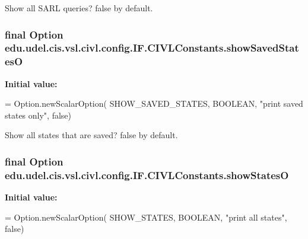 Show all S\+A\+R\+L queries? false by default. 

\hypertarget{classedu_1_1udel_1_1cis_1_1vsl_1_1civl_1_1config_1_1IF_1_1CIVLConstants_aa0f2c2af31ae647bc2dc6398a47031cb}{}
\subsubsection[{show\+Saved\+States\+O}]{\setlength{\rightskip}{0pt plus 5cm}final Option edu.\+udel.\+cis.\+vsl.\+civl.\+config.\+I\+F.\+C\+I\+V\+L\+Constants.\+show\+Saved\+States\+O\hspace{0.3cm}{\ttfamily [static]}}\label{classedu_1_1udel_1_1cis_1_1vsl_1_1civl_1_1config_1_1IF_1_1CIVLConstants_aa0f2c2af31ae647bc2dc6398a47031cb}
{\bfseries Initial value\+:}
\begin{DoxyCode}
= Option.newScalarOption(
            SHOW\_SAVED\_STATES, BOOLEAN, \textcolor{stringliteral}{"print saved states only"}, \textcolor{keyword}{false})
\end{DoxyCode}


Show all states that are saved? false by default. 

\hypertarget{classedu_1_1udel_1_1cis_1_1vsl_1_1civl_1_1config_1_1IF_1_1CIVLConstants_a4de1a46f393deba38173ced23addf465}{}
\subsubsection[{show\+States\+O}]{\setlength{\rightskip}{0pt plus 5cm}final Option edu.\+udel.\+cis.\+vsl.\+civl.\+config.\+I\+F.\+C\+I\+V\+L\+Constants.\+show\+States\+O\hspace{0.3cm}{\ttfamily [static]}}\label{classedu_1_1udel_1_1cis_1_1vsl_1_1civl_1_1config_1_1IF_1_1CIVLConstants_a4de1a46f393deba38173ced23addf465}
{\bfseries Initial value\+:}
\begin{DoxyCode}
= Option.newScalarOption(
            SHOW\_STATES, BOOLEAN, \textcolor{stringliteral}{"print all states"}, \textcolor{keyword}{false})
\end{DoxyCode}


